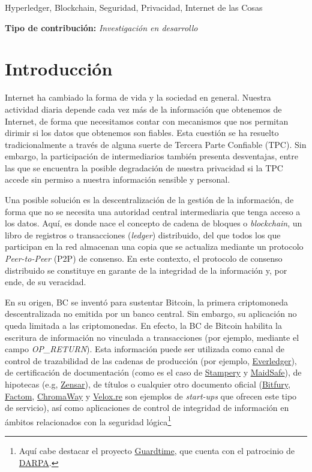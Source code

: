 \documentclass[10pt,conference,a4paper]{IEEEtran}
\begin{document}
\begin{IEEEkeywords}
Hyperledger, Blockchain, Seguridad, Privacidad, Internet de las Cosas
\end{IEEEkeywords}

{\bf Tipo de contribución:}  {\it Investigación en desarrollo}

\section{Introducción}

Internet ha cambiado la forma de vida y la sociedad en
general. Nuestra actividad diaria depende cada vez más de la
información que obtenemos de Internet, de forma que necesitamos contar
con mecanismos que nos permitan dirimir si los datos que obtenemos son
fiables. Esta cuestión se ha resuelto tradicionalmente a través de
alguna suerte de Tercera Parte Confiable (TPC). Sin embargo, la
participación de intermediarios también presenta desventajas, entre
las que se encuentra la posible degradación de nuestra privacidad si 
la TPC  accede sin permiso a nuestra información sensible y personal.

Una posible solución es la descentralización de la gestión de la
información, de
forma que no se necesita una autoridad central intermediaria que tenga
acceso a los datos. Aquí, es donde nace el
concepto de cadena de bloques o \textit{blockchain}, un libro de
registros o transacciones (\textit{ledger}) distribuido, del que todos
los que participan en la red almacenan una copia que se actualiza
mediante un protocolo \textit{Peer-to-Peer} (P2P) de consenso. En este contexto, el
protocolo de consenso distribuido se constituye en garante de la
integridad de la información y, por ende, de su veracidad. 

En su origen, BC se inventó para sustentar Bitcoin, la primera
criptomoneda descentralizada no emitida por un banco central. Sin
embargo, su aplicación no queda limitada a las criptomonedas. En
efecto, la BC de Bitcoin habilita la escritura de información no
vinculada a transacciones (por ejemplo, mediante el campo
\textsc{\textit{OP\_RETURN}}). Esta información puede ser utilizada como canal
de control de trazabilidad de las cadenas de
producción (por ejemplo,
\href{https://www.everledger.io/}{Everledger}), de certificación de
documentación (como es el caso de
\href{https://stampery.com/}{Stampery} y
\href{https://maidsafe.net/}{MaidSafe}), de hipotecas (e.g,
\href{http://www.zensar.com/blogs/2017/05/reinventing-mortgage-with-blockchain/}{Zensar}),
de títulos o cualquier otro documento oficial
(\href{http://bitfury.com/}{Bitfury},
\href{https://www.factom.com/}{Factom},
\href{https://chromaway.com/}{ChromaWay} y
\href{https://www.velox.re/}{Velox.re} son ejemplos de
\emph{start-ups} que ofrecen este tipo de servicio), así como
aplicaciones de control de integridad de información en ámbitos
relacionados con la seguridad lógica\footnote{Aquí cabe destacar el
  proyecto \href{https://guardtime.com/}{Guardtime}, que cuenta con el
  patrocinio de \href{https://www.darpa.mil/}{DARPA}.}
\end{document}
